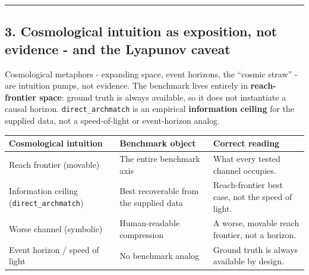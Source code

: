 \documentclass[
  11pt,
]{article}
\newcounter{none} %
\begin{document}
\begin{center}\rule{0.5\linewidth}{0.5pt}\end{center}

\subsection{3. Cosmological intuition as exposition,
not evidence - and the Lyapunov
caveat}\label{cosmological-intuition-as-exposition-not-evidence---and-the-lyapunov-caveat}

Cosmological metaphors - expanding space, event
horizons, the ``cosmic straw'' - are intuition pumps,
not evidence. The benchmark lives entirely in
\textbf{reach-frontier space}: ground truth is always
available, so it does not instantiate a causal horizon.
\texttt{direct\_archmatch} is an empirical
\textbf{information ceiling} for the supplied data, not
a speed-of-light or event-horizon analog.

{\def\LTcaptype{none} %
\begin{longtable}[]{@{}
  >{\raggedright\arraybackslash}p{}
  >{\raggedright\arraybackslash}p{}
  >{\raggedright\arraybackslash}p{}@{}}
\toprule\noalign{}
\begin{minipage}[b]{\linewidth}\raggedright
Cosmological intuition
\end{minipage} &
\begin{minipage}[b]{\linewidth}\raggedright
Benchmark object
\end{minipage} &
\begin{minipage}[b]{\linewidth}\raggedright
Correct reading
\end{minipage} \\
\midrule\noalign{}
\endhead
\bottomrule\noalign{}
\endlastfoot
Reach frontier (movable) & The entire benchmark axis &
What every tested channel occupies. \\
Information ceiling (\texttt{direct\_archmatch}) & Best
recoverable from the supplied data & Reach-frontier
best case, not the speed of light. \\
Worse channel (symbolic) & Human-readable compression &
A worse, movable reach frontier, not a horizon. \\
Event horizon / speed of light & No benchmark analog &
Ground truth is always available by design. \\
\end{longtable}
}
\end{document}
